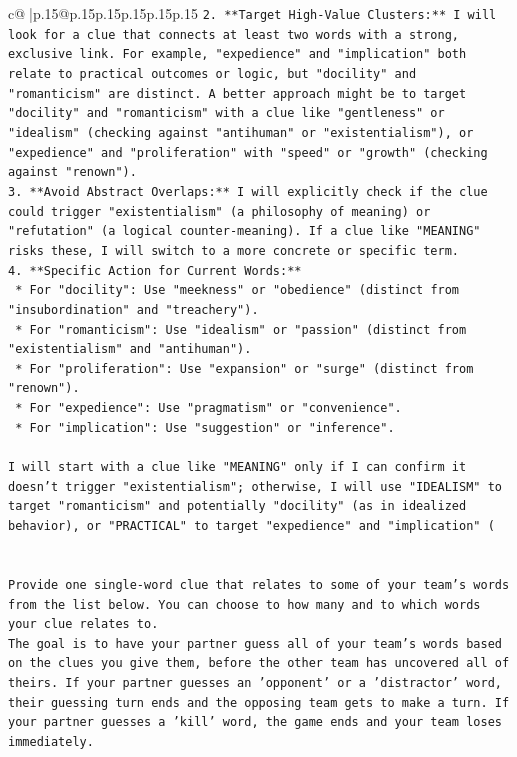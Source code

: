 \documentclass{article}
\begin{document}
{\begin{supertabular}{c@{$\;$}|p{.15\linewidth}@{}p{.15\linewidth}p{.15\linewidth}p{.15\linewidth}p{.15\linewidth}p{.15\linewidth}}
{{{\texttt{2.  **Target High{-}Value Clusters:** I will look for a clue that connects at least two words with a strong, exclusive link. For example, "expedience" and "implication" both relate to practical outcomes or logic, but "docility" and "romanticism" are distinct. A better approach might be to target "docility" and "romanticism" with a clue like "gentleness" or "idealism" (checking against "antihuman" or "existentialism"), or "expedience" and "proliferation" with "speed" or "growth" (checking against "renown").} \\
\texttt{3.  **Avoid Abstract Overlaps:** I will explicitly check if the clue could trigger "existentialism" (a philosophy of meaning) or "refutation" (a logical counter{-}meaning). If a clue like "MEANING" risks these, I will switch to a more concrete or specific term.} \\
\texttt{4.  **Specific Action for Current Words:**} \\
\texttt{    *   For "docility": Use "meekness" or "obedience" (distinct from "insubordination" and "treachery").} \\
\texttt{    *   For "romanticism": Use "idealism" or "passion" (distinct from "existentialism" and "antihuman").} \\
\texttt{    *   For "proliferation": Use "expansion" or "surge" (distinct from "renown").} \\
\texttt{    *   For "expedience": Use "pragmatism" or "convenience".} \\
\texttt{    *   For "implication": Use "suggestion" or "inference".} \\
\\ 
\texttt{I will start with a clue like "MEANING" only if I can confirm it doesn't trigger "existentialism"; otherwise, I will use "IDEALISM" to target "romanticism" and potentially "docility" (as in idealized behavior), or "PRACTICAL" to target "expedience" and "implication" (} \\
\\ 
\\ 
\texttt{Provide one single{-}word clue that relates to some of your team's words from the list below. You can choose to how many and to which words your clue relates to.} \\
\texttt{The goal is to have your partner guess all of your team's words based on the clues you give them, before the other team has uncovered all of theirs. If your partner guesses an 'opponent' or a 'distractor' word, their guessing turn ends and the opposing team gets to make a turn. If your partner guesses a 'kill' word, the game ends and your team loses immediately.} \\
}}}
\end{supertabular}}
\end{document}
